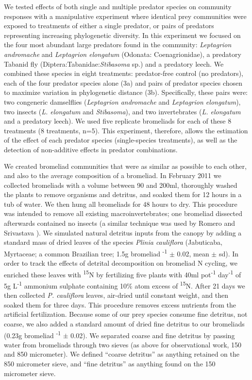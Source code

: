 \documentclass[11pt]{article}
\begin{document}
We tested effects of both single and multiple predator species on
community responses with a manipulative experiment where identical prey
communities were exposed to treatments of either a single predator, or
pairs of predators representing increasing phylogenetic diversity. In
this experiment we focused on the four most abundant large predators
found in the community: \emph{Leptagrion andromache} and
\emph{Leptagrion elongatum} (Odonata: Coenagrionidae), a predatory
Tabanid fly (Diptera:Tabanidae:\emph{Stibasoma} sp.) and a predatory
leech. We combined these species in eight treatments: predator-free
control (no predators), each of the four predator species alone (3a) and
pairs of predator species chosen to maximize variation in phylogenetic
distance (3b). Specifically, these pairs were: two congeneric
damselflies (\emph{Leptagrion andromache} and \emph{Leptagrion
elongatum}), two insects (\emph{L. elongatum} and \emph{Stibasoma}), and
two invertebrates (\emph{L. elongatum} and a predatory leech). We used
five replicate bromeliads for each of these 8 treatments (8 treatments,
n=5). This experiment, therefore, allows the estimation of the effect of
each predator species (single-species treatments), as well as the
detection of non-additive effects in predator combinations.

We created bromeliad communities that were as similar as possible to
each other, and also to the average composition of a bromeliad. In
February 2011 we collected bromeliads with a volume between 90 and
200ml, thoroughly washed the plants to remove organisms and detritus,
and soaked them for 12 hours in a tub of water. We then hung all
bromeliads for 48 hours to dry. This procedure was intended to remove
all existing macroinvertebrates; one bromeliad dissected afterwards
contained no insects (a similar technique was used by Romero and
Srivastava \citeyearpar{Romero2010}). We simulated natural detritus
inputs from the canopy by adding a standard mass of dried leaves of the
species \emph{Plinia cauliflora} (Jabuticaba, Myrtaceae; a common
Brazilian tree; 1.5g bromeliad \textsuperscript{-1} $\pm$ 0.02, mean $\pm$ sd).
In order to track the effects of detrital decomposition on bromeliad N
cycling, we enriched these leaves with \textsuperscript{15}N by
fertilizing five plants with 40ml pot\textsuperscript{-1}
day\textsuperscript{-1} of 5g L\textsuperscript{-1} ammonium sulphate
containing 10\% atom excess of \textsuperscript{15}N. After 21 days we
then collected \emph{P. cauliflora} leaves, air-dried until constant
weight, and then soaked them for three days. This procedure removes
excess nutrients from the artificial fertilization. Because some of our
prey species consume fine detritus, not coarse, we also added a standard
amount of dried fine detritus to our bromeliads (0.23g bromeliad
\textsuperscript{-1} $\pm$ 0.02). We separated coarse and fine detritus by
passing water from bromeliads through two sieves (as above for
observational work, 150 and 850 micrometer). We defined ``coarse detritus'' as
anything retained on the 850 micrometer sieve, and ``fine detritus'' as anything
found on the 150 micrometer sieve.
\end{document}
